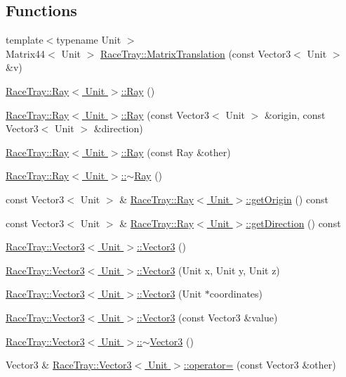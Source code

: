 \subsection*{Functions}
\begin{DoxyCompactItemize}
\item 
{\footnotesize template$<$typename Unit $>$ }\\Matrix44$<$ Unit $>$ \hyperlink{group___math_ga2f3aac0fbdfd537a9286647da4ab7e6b}{Race\-Tray\-::\-Matrix\-Translation} (const Vector3$<$ Unit $>$ \&v)
\item 
\hyperlink{group___math_ga2e3d2c29f2df4ab3da10da79d4acb852}{Race\-Tray\-::\-Ray$<$ Unit $>$\-::\-Ray} ()
\item 
\hyperlink{group___math_gabe89aef5906b96af94ad94ad0deba455}{Race\-Tray\-::\-Ray$<$ Unit $>$\-::\-Ray} (const Vector3$<$ Unit $>$ \&origin, const Vector3$<$ Unit $>$ \&direction)
\item 
\hyperlink{group___math_ga8e46b1356e03d968ffd813076d6818b2}{Race\-Tray\-::\-Ray$<$ Unit $>$\-::\-Ray} (const Ray \&other)
\item 
\hyperlink{group___math_ga8b0e575ce5df046c0c7615c32a96a46f}{Race\-Tray\-::\-Ray$<$ Unit $>$\-::$\sim$\-Ray} ()
\item 
const Vector3$<$ Unit $>$ \& \hyperlink{group___math_gab1690c909fff67ff5c878aa6f05bfe2b}{Race\-Tray\-::\-Ray$<$ Unit $>$\-::get\-Origin} () const 
\item 
const Vector3$<$ Unit $>$ \& \hyperlink{group___math_gaab0b0ed57af0899286c2996dfdc9418b}{Race\-Tray\-::\-Ray$<$ Unit $>$\-::get\-Direction} () const 
\item 
\hyperlink{group___math_ga0f49191f7e001e7f7ae1cb49522118b4}{Race\-Tray\-::\-Vector3$<$ Unit $>$\-::\-Vector3} ()
\item 
\hyperlink{group___math_gaaa5ebab83f6d1f282df85ece8153311d}{Race\-Tray\-::\-Vector3$<$ Unit $>$\-::\-Vector3} (Unit x, Unit y, Unit z)
\item 
\hyperlink{group___math_ga1467854ce0d4ef24f84fecf84446910b}{Race\-Tray\-::\-Vector3$<$ Unit $>$\-::\-Vector3} (Unit $\ast$coordinates)
\item 
\hyperlink{group___math_ga636420f8171f95d953e80b9752ca98e8}{Race\-Tray\-::\-Vector3$<$ Unit $>$\-::\-Vector3} (const Vector3 \&value)
\item 
\hyperlink{group___math_ga5545e13e2e2861ece8f14b12a6a8101f}{Race\-Tray\-::\-Vector3$<$ Unit $>$\-::$\sim$\-Vector3} ()
\item 
Vector3 \& \hyperlink{group___math_gadcef1abbe010682b06779beab2fddc9e}{Race\-Tray\-::\-Vector3$<$ Unit $>$\-::operator=} (const Vector3 \&other)

\end{DoxyCompactItemize}
